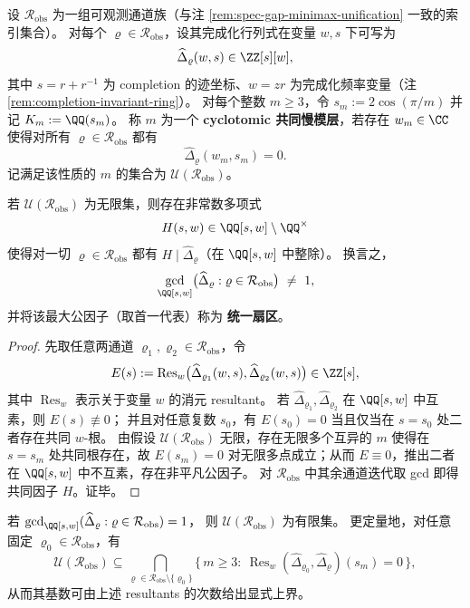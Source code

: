 \begin{definition}\label{def:cyclotomic-common-slowmode-layer}
设 \(\mathcal{R}_{\mathrm{obs}}\) 为一组可观测通道族（与注 \ref{rem:spec-gap-minimax-unification} 一致的索引集合）。
对每个 \(\varrho\in\mathcal{R}_{\mathrm{obs}}\)，设其完成化行列式在变量 \(w,s\) 下可写为
\[
\widehat{\Delta}_{\varrho}(w,s)\in\ZZ[s][w],
\]
其中 \(s=r+r^{-1}\) 为 completion 的迹坐标、\(w=zr\) 为完成化频率变量（注 \ref{rem:completion-invariant-ring}）。
对每个整数 \(m\ge 3\)，令 \(s_m:=2\cos(\pi/m)\) 并记 \(K_m:=\QQ(s_m)\)。
称 \(m\) 为一个 \textbf{cyclotomic 共同慢模层}，若存在 \(w_m\in\CC\) 使得对所有 \(\varrho\in\mathcal{R}_{\mathrm{obs}}\) 都有
\[
\widehat{\Delta}_{\varrho}(w_m,s_m)=0.
\]
记满足该性质的 \(m\) 的集合为 \(\mathcal{U}(\mathcal{R}_{\mathrm{obs}})\)。
\end{definition}

\begin{theorem}[循环特化刚性：无限多层共同慢模 \texorpdfstring{$\Rightarrow$}{=>} 统一扇区存在]\label{thm:cyclotomic-specialization-rigidity}
若 \(\mathcal{U}(\mathcal{R}_{\mathrm{obs}})\) 为无限集，则存在非常数多项式
\[
H(s,w)\in \QQ[s,w]\setminus\QQ^\times
\]
使得对一切 \(\varrho\in\mathcal{R}_{\mathrm{obs}}\) 都有 \(H\mid \widehat{\Delta}_{\varrho}\)（在 \(\QQ[s,w]\) 中整除）。
换言之，
\[
\gcd_{\QQ[s,w]}\bigl(\widehat{\Delta}_{\varrho}:\varrho\in\mathcal{R}_{\mathrm{obs}}\bigr)\ \neq\ 1,
\]
并将该最大公因子（取首一代表）称为 \textbf{统一扇区}。
\end{theorem}
\begin{proof}
先取任意两通道 \(\varrho_1,\varrho_2\in\mathcal{R}_{\mathrm{obs}}\)，令
\[
E(s):=\operatorname{Res}_{w}\bigl(\widehat{\Delta}_{\varrho_1}(w,s),\widehat{\Delta}_{\varrho_2}(w,s)\bigr)\in\ZZ[s],
\]
其中 \(\operatorname{Res}_{w}\) 表示关于变量 \(w\) 的消元 resultant。
若 \(\widehat{\Delta}_{\varrho_1},\widehat{\Delta}_{\varrho_2}\) 在 \(\QQ[s,w]\) 中互素，则 \(E(s)\not\equiv 0\)；
并且对任意复数 \(s_0\)，有 \(E(s_0)=0\) 当且仅当在 \(s=s_0\) 处二者存在共同 \(w\)-根。
由假设 \(\mathcal{U}(\mathcal{R}_{\mathrm{obs}})\) 无限，存在无限多个互异的 \(m\) 使得在 \(s=s_m\) 处共同根存在，故 \(E(s_m)=0\) 对无限多点成立；从而 \(E\equiv 0\)，推出二者在 \(\QQ[s,w]\) 中不互素，存在非平凡公因子。
对 \(\mathcal{R}_{\mathrm{obs}}\) 中其余通道迭代取 gcd 即得共同因子 \(H\)。证毕。
\end{proof}

\begin{corollary}[有限可证伪性：无统一扇区 \texorpdfstring{$\Rightarrow$}{=>} 共同慢模层必有限]\label{cor:cyclotomic-specialization-falsifiability}
若
\(
\gcd_{\QQ[s,w]}(\widehat{\Delta}_{\varrho}:\varrho\in\mathcal{R}_{\mathrm{obs}})=1
\)，
则 \(\mathcal{U}(\mathcal{R}_{\mathrm{obs}})\) 为有限集。
更定量地，对任意固定 \(\varrho_0\in\mathcal{R}_{\mathrm{obs}}\)，有
\[
\mathcal{U}(\mathcal{R}_{\mathrm{obs}})
\subseteq
\bigcap_{\varrho\in\mathcal{R}_{\mathrm{obs}}\setminus\{\varrho_0\}}
\bigl\{\,m\ge 3:\ \operatorname{Res}_{w}(\widehat{\Delta}_{\varrho_0},\widehat{\Delta}_{\varrho})(s_m)=0\,\bigr\},
\]
从而其基数可由上述 resultants 的次数给出显式上界。
\end{corollary}

